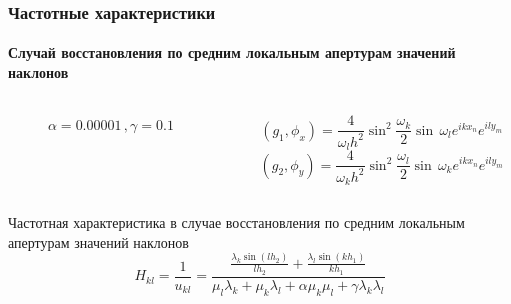 \documentclass[11pt]{beamer}
\begin{document}
\begin{frame}
\frametitle{Частотные характеристики}
\framesubtitle{Случай восстановления по средним локальным апертурам значений наклонов}
\begin{columns}
\begin{column}{0.4\linewidth}
\begin{figure}[H]
\caption{$\alpha = 0.00001\,,\gamma = 0.1$}
\end{figure}
\end{column}
\begin{column}{0.5\textwidth}
$$(g_1, \phi_x) = \frac{4}{\omega_l h^2}  \sin^2\frac{\omega_k}{2}  \sin\,\omega_l e^{ikx_n}e^{ily_m}$$
$$(g_2, \phi_y) = \frac{4}{\omega_k h^2}  \sin^2\frac{\omega_l}{2}  \sin\,\omega_k e^{ikx_n} e^{ily_m}$$
\end{column}

\end{columns}
\begin{block}{Частотная характеристика в случае восстановления по средним локальным апертурам значений наклонов}
$$
H_{kl} = \frac{1}{u_{kl}} = \frac{\frac{\lambda_k \sin(lh_2)}{lh_2} + \frac{\lambda_l \sin(kh_1)}{kh_1}}{\mu_l \lambda_k + \mu_k \lambda_l + \alpha \mu_k \mu_l + \gamma \lambda_k \lambda_l}
$$
\end{block}
\end{frame}
\end{document}
